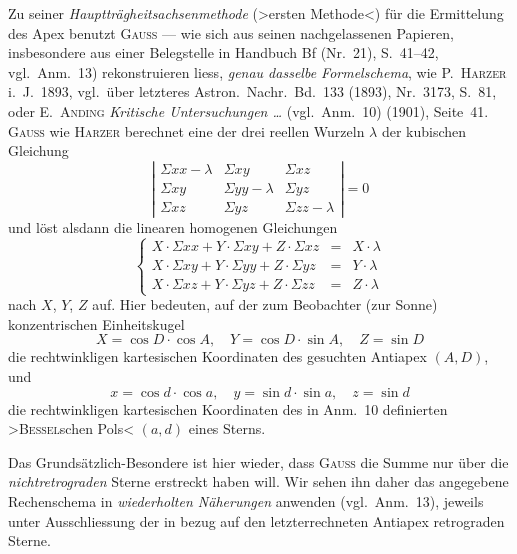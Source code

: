 \documentclass[12pt,a4paper]{article}
\theoremstyle{plain}
\theoremstyle{definition}
\theoremstyle{remark}
\begin{document}
\begin{small}
Zu seiner \textit{Haupttr\"agheitsachsenmethode} (\textgreater{}ersten Methode\textless{}) f\"ur die Ermittelung
des Apex benutzt \textsc{Gauss} --- wie sich aus seinen nachgelassenen Papieren,
insbesondere aus einer Belegstelle in Handbuch Bf (Nr.~21), S.~41--42, vgl.~Anm.~13)
rekonstruieren liess, \textit{genau dasselbe Formelschema}, wie \textsc{P.~Harzer} i.~J.~1893,
vgl.~\"uber letzteres Astron.~Nachr.~Bd.~133 (1893), Nr.~3173, S.~81, oder
\textsc{E.~Anding} \textit{Kritische Untersuchungen \dots{}} (vgl.~Anm.~10) (1901), Seite~41.
\textsc{Gauss} wie \textsc{Harzer} berechnet eine der drei reellen Wurzeln $\lambda$ der
kubischen Gleichung
\begin{equation}\tag{7}
\left|\begin{array}{ccc}
\Sigma xx - \lambda & \Sigma xy & \Sigma xz\\
\Sigma xy & \Sigma yy - \lambda & \Sigma yz\\
\Sigma xz & \Sigma yz & \Sigma zz - \lambda
\end{array}\right| = 0
\end{equation}
und l\"ost alsdann die linearen homogenen Gleichungen
\begin{equation}\tag{8}
\left\{\begin{array}{rcl}
X\cdot\Sigma xx + Y\cdot\Sigma xy + Z\cdot\Sigma xz & = & X\cdot\lambda\\
X\cdot\Sigma xy + Y\cdot\Sigma yy + Z\cdot\Sigma yz & = & Y\cdot\lambda\\
X\cdot\Sigma xz + Y\cdot\Sigma yz + Z\cdot\Sigma zz & = & Z\cdot\lambda
\end{array}\right.
\end{equation}
nach $X$, $Y$, $Z$ auf. Hier bedeuten, auf der zum Beobachter (zur Sonne)
konzentrischen Einheitskugel
\begin{equation}\tag{9}
X = \cos D\cdot\cos A,\quad Y = \cos D\cdot\sin A,\quad Z = \sin D
\end{equation}
die rechtwinkligen kartesischen Koordinaten des gesuchten Antiapex $(A, D)$, und
\begin{equation}\tag{10}
x = \cos d\cdot\cos a,\quad y = \sin d\cdot\sin a,\quad z = \sin d
\end{equation}
die rechtwinkligen kartesischen Koordinaten des in Anm.~10 definierten
\textgreater{}\textsc{Bessel}schen Pols\textless{} $(a, d)$ eines Sterns.

Das Grunds\"atzlich-Besondere ist hier wieder, dass \textsc{Gauss} die Summe nur
\"uber die \textit{nichtretrograden} Sterne erstreckt haben will. Wir sehen ihn daher
das angegebene Rechenschema in \textit{wiederholten N\"aherungen} anwenden (vgl.~Anm.~13),
jeweils unter Ausschliessung der in bezug auf den letzterrechneten Antiapex
retrograden Sterne.
\end{small}
\end{document}
